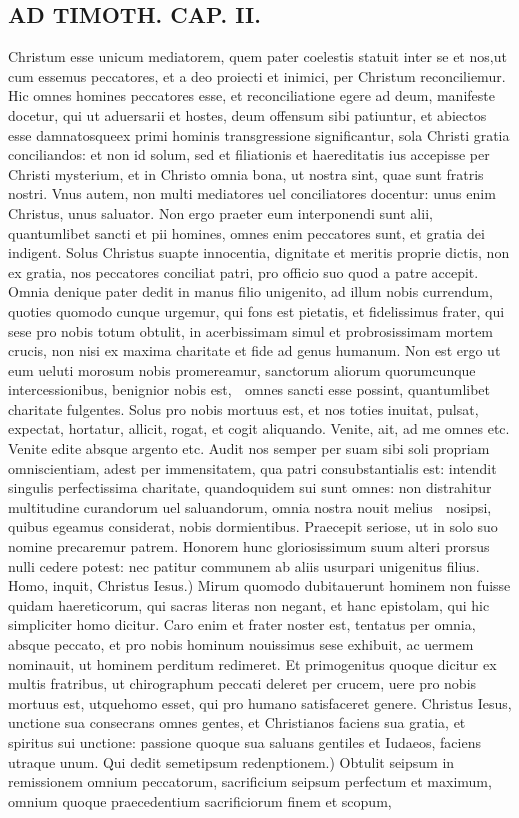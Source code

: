 \documentclass{article}
\begin{document}
\begin{pages}
\section*{AD TIMOTH. CAP. II. }
\marginpar{[ p.485 ]}\pstart Christum esse unicum mediatorem, quem pater coelestis statuit inter se et nos,ut cum essemus peccatores, et a deo proiecti et inimici, per Christum reconciliemur. Hic omnes homines peccatores esse, et reconciliatione egere ad deum, manifeste docetur, qui ut aduersarii et hostes, deum offensum sibi patiuntur, et abiectos esse damnatosqueex primi hominis transgressione significantur, sola Christi gratia conciliandos: et non id solum, sed et filiationis et haereditatis ius accepisse per Christi mysterium, et in Christo omnia bona, ut nostra sint, quae sunt fratris nostri. Vnus autem, non multi mediatores uel conciliatores docentur: unus enim Christus, unus saluator. Non ergo praeter eum interponendi sunt alii, quantumlibet sancti et pii homines, omnes enim peccatores sunt, et gratia dei indigent. Solus Christus suapte innocentia, dignitate et meritis proprie dictis, non ex gratia, nos peccatores conciliat patri, pro officio suo quod a patre accepit. Omnia denique  pater dedit in manus filio unigenito, ad illum nobis currendum, quoties quomodo cunque  urgemur, qui fons est pietatis, et fidelissimus frater, qui sese pro nobis totum obtulit, in acerbissimam simul et probrosissimam mortem crucis, non nisi ex maxima charitate et fide ad genus humanum. Non est ergo ut eum ueluti morosum nobis promereamur, sanctorum aliorum quorumcunque  intercessionibus, benignior nobis est,  omnes sancti esse possint, quantumlibet charitate fulgentes. Solus pro nobis mortuus est, et nos toties inuitat, pulsat, expectat, hortatur, allicit, rogat, et cogit aliquando. Venite, ait, ad me omnes etc. Venite edite absque  argento etc. Audit nos semper per suam sibi soli propriam omniscientiam, adest per immensitatem, qua patri consubstantialis est: intendit singulis perfectissima charitate, quandoquidem sui sunt omnes: non distrahitur multitudine curandorum uel saluandorum, omnia nostra nouit melius  nosipsi, quibus egeamus considerat, nobis dormientibus. Praecepit seriose, ut in solo suo nomine precaremur patrem. Honorem hunc gloriosissimum suum alteri prorsus nulli cedere potest: nec patitur communem ab aliis usurpari unigenitus filius. Homo, inquit, Christus Iesus.) Mirum quomodo dubitauerunt hominem non fuisse quidam haereticorum, qui sacras literas non negant, et hanc epistolam, qui hic simpliciter homo dicitur. Caro enim et frater noster est, tentatus per omnia, absque  peccato, et pro nobis hominum nouissimus sese exhibuit, ac uermem nominauit, ut hominem perditum redimeret. Et primogenitus quoque  dicitur ex multis fratribus, ut chirographum peccati deleret per crucem, uere pro nobis mortuus est, utquehomo esset, qui pro humano satisfaceret genere. Christus Iesus, unctione sua consecrans omnes gentes, et Christianos faciens sua gratia, et spiritus sui unctione: passione quoque  sua saluans gentiles et Iudaeos, faciens utraque  unum. Qui dedit semetipsum redenptionem.) Obtulit seipsum in remissionem omnium peccatorum, sacrificium seipsum perfectum et maximum, omnium quoque  praecedentium sacrificiorum finem et scopum, 
\end{pages}
\end{document}
